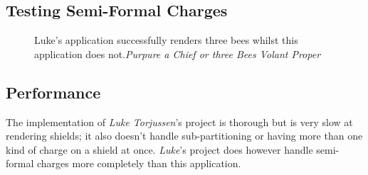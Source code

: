 \subsection{Testing Semi-Formal Charges}

\begin{figure}[H]
\hfill
{}
\hfill
\caption{Luke's application successfully renders three bees whilst this application does not.\emph{Purpure a Chief or three Bees Volant Proper }}
\end{figure}


\subsection{Performance}
The implementation of \emph{Luke Torjussen}'s project is thorough but is very slow at rendering shields; it also doesn't handle sub-partitioning or having more than one kind of charge on a shield at once.   \emph{Luke}'s project does however handle semi-formal charges more completely than this application.  